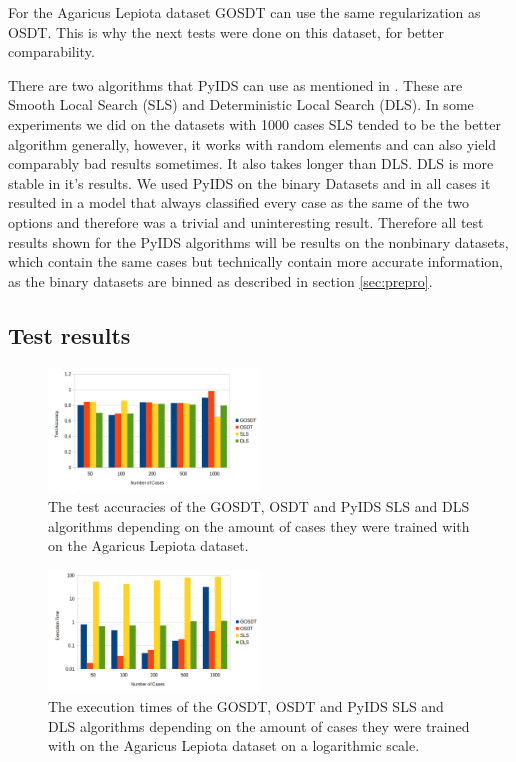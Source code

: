 \documentclass[a4paper,preprint]{sig-alternate-xt}
\begin{document}
For the Agaricus Lepiota dataset GOSDT can use the same regularization as OSDT. This is why the next tests were done on this dataset, for better comparability. 

There are two algorithms that PyIDS can use as mentioned in \cite{pySchwachsinn}. These are Smooth Local Search (SLS) and Deterministic Local Search (DLS). In some experiments we did on the datasets with 1000 cases SLS tended to be the better algorithm generally, however, it works with random elements and can also yield comparably bad results sometimes. It also takes longer than DLS. DLS is more stable in it's results. We used PyIDS on the binary Datasets and in all cases it resulted in a model that always classified every case as the same of the two options and therefore was a trivial and uninteresting result. Therefore all test results shown for the PyIDS algorithms will be results on the nonbinary datasets, which contain the same cases but technically contain more accurate information, as the binary datasets are binned as described in section \ref{sec:prepro}.

\subsection{Test results}
\label{subsec:testresults}


\begin{figure}[h]
    \centering
    \includegraphics[width=0.5\textwidth]{SizeTests_Acc.png}
    \caption{The test accuracies of the GOSDT, OSDT and PyIDS SLS and DLS algorithms depending on the amount of cases they were trained with on the Agaricus Lepiota dataset.}
    \label{fig:size1}
\end{figure}

\begin{figure}[h]
    \centering
    \includegraphics[width=0.5\textwidth]{sizetests_time2.png}
    \caption{The execution times of the GOSDT, OSDT and PyIDS SLS and DLS algorithms depending on the amount of cases they were trained with on the Agaricus Lepiota dataset on a logarithmic scale.}
    \label{fig:size2}
\end{figure}
\end{document}
